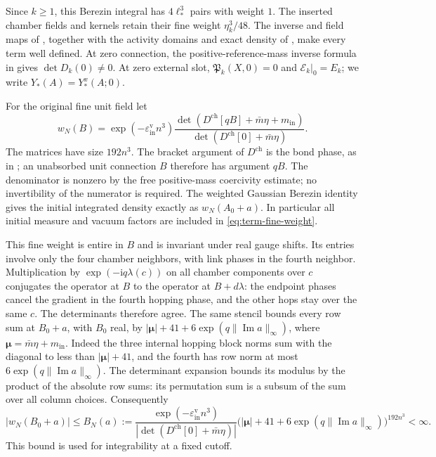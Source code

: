 \documentclass[11pt,letterpaper,reqno]{amsart}
\begin{document}
Since $k\ge1$, this Berezin integral has $4\ell_*^3$
pairs with weight $1$. The inserted chamber fields
and kernels retain their fine weight $\eta_k^3/48$.
The inverse and field maps of \cite[Theorem~A and \S4.2]{FermionBlock},
together with the activity domains and exact density of
\cite[\S2.3 and \S3]{NonlinearStep}, make every term well defined.
At zero connection, the positive-reference-mass inverse formula in
\cite[Proposition~3.1]{NonlinearStep}
gives $\det D_k(0)\ne0$.
At zero external slot,
$\mathfrak P_k(X,0)=0$ and $\mathscr E_k|_0=E_k$;
we write $Y_*(A)=Y_*^x(A;0)$.

For the original fine unit field let
\begin{equation}\label{eq:term-fine-weight}
 w_N(B)=
 \exp(-\varepsilon_{\mathrm{in}}^{\mathrm v}n^3)
       \frac{\det(D^{\mathrm{ch}}[qB]+\bar m\eta+m_{\mathrm{in}})}
                              {\det(D^{\mathrm{ch}}[0]+\bar m\eta)} .
\end{equation}
The matrices have size $192n^3$.
The bracket argument of $D^{\mathrm{ch}}$ is the bond phase,
as in \cite[\S1.1, (6)]{PositiveProbe}; an unabsorbed unit
connection $B$ therefore has argument $qB$.
The denominator is nonzero by the free positive-mass
coercivity estimate; no invertibility of the numerator
is required.
The weighted Gaussian Berezin identity gives
the initial integrated density exactly as $w_N(A_0+a)$.
In particular all initial measure and vacuum factors
are included in \eqref{eq:term-fine-weight}.

This fine weight is entire in $B$ and is invariant
under real gauge shifts.
Its entries involve only the four chamber neighbors,
with link phases in the fourth neighbor.
Multiplication by $\exp(-\mathrm i q\lambda(c))$ on
all chamber components over $c$ conjugates the operator
at $B$ to the operator at $B+d\lambda$: the endpoint
phases cancel the gradient in the fourth hopping phase,
and the other hops stay over the same $c$.
The determinants therefore agree.
The same stencil bounds every row sum at $B_0+a$,
with $B_0$ real, by
$|\boldsymbol\mu|+41+6\exp(q\|\operatorname{Im}a\|_\infty)$,
where $\boldsymbol\mu=\bar m\eta+m_{\mathrm{in}}$.
Indeed the three internal hopping block norms sum
with the diagonal to less than $|\boldsymbol\mu|+41$,
and the fourth has row norm at most
$6\exp(q\|\operatorname{Im}a\|_\infty)$.
The determinant expansion bounds its modulus by
the product of the absolute row sums: its permutation
sum is a subsum of the sum over all column choices.
Consequently
\begin{equation}\label{eq:term-finite-density-bound}
 |w_N(B_0+a)|\le B_N(a):=
 \frac{\exp(-\varepsilon_{\mathrm{in}}^{\mathrm v}n^3)}
            {|\det(D^{\mathrm{ch}}[0]+\bar m\eta)|}
       \big(|\boldsymbol\mu|+41
                     +6\exp(q\|\operatorname{Im}a\|_\infty)\big)^{192n^3}
                                                        <\infty .
\end{equation}
This bound is used for integrability at a fixed cutoff.
\end{document}
